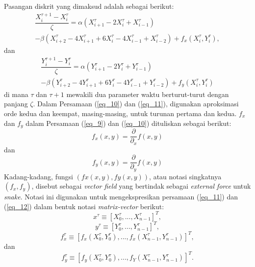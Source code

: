 Pasangan diskrit yang dimaksud adalah sebagai berikut:
\begin{multline}\label{eq_9}
\dfrac{ X^{\tau+1}_i - X^{\tau}_i }{\zeta} = \alpha(  X^\tau_{i+1}  - 2X^\tau_i + X^\tau_{i-1}  ) \\
-\beta (  X^\tau_{i+2}  - 4X^\tau_{i+1} + 6X^\tau_i - 4X^\tau_{i-1} + X^\tau_{i-2} ) + f_{x}(X^\tau_i, Y^\tau_i),
\end{multline}
dan
\begin{multline}
\label{eq_10}
\dfrac{ Y^{\tau+1}_i - Y^{\tau}_i }{\zeta} = \alpha(  Y^\tau_{i+1}  - 2Y^\tau_i + Y^\tau_{i-1}  ) \\
-\beta (  Y^\tau_{i+2}  - 4Y^\tau_{i+1} + 6Y^\tau_i - 4Y^\tau_{i-1} + Y^\tau_{i-2} ) + f_{y}(X^\tau_i, Y^\tau_i)
\end{multline}
di mana $\tau$ dan $\tau+1$ mewakili dua parameter waktu berturut-turut dengan panjang $\zeta$. Dalam Persamaan (\ref{eq_10}) dan (\ref{eq_11}), digunakan aproksimasi orde kedua dan keempat, masing-masing, untuk turunan pertama dan kedua. $f_x$ dan $f_y$ dalam Persamaan (\ref{eq_9}) dan (\ref{eq_10}) dituliskan sebagai berikut:
\begin{equation}
\label{eq_11}
f_x(x,y)=\dfrac{\partial}{\partial_x}f(x,y)
\end{equation}
dan
\begin{equation}
\label{eq_12}
f_y(x,y)=\dfrac{\partial}{\partial_y}f(x,y)
\end{equation}
Kadang-kadang, fungsi $(fx(x, y), fy(x, y))$, atau notasi singkatnya $(f_x, f_y)$, disebut sebagai \emph{vector field} yang bertindak sebagai \emph{external force} untuk \emph{snake}. Notasi ini digunakan untuk mengekspresikan persamaan (\ref{eq_11}) dan (\ref{eq_12}) dalam bentuk notasi \emph{matrix-vector} berikut\citep{acton2007biomedical:19}:
\begin{equation}
\label{eq_13}
x^\tau \equiv \left[X^\tau_0,...,X^\tau_{n-1}\right]^T ,
\end{equation}
\begin{equation}
\label{eq_14}
y^\tau \equiv \left[Y^\tau_0,...,Y^\tau_{n-1}\right]^T ,
\end{equation}
\begin{equation}
\label{eq_15}
f^\tau_x \equiv \left[f_x(X^\tau_0, Y^\tau_0),...,f_x(X^\tau_{n-1}, Y^\tau_{n-1})\right]^T ,
\end{equation}
dan
\begin{equation}
\label{eq_16}
f^\tau_y \equiv \left[f_y(X^\tau_0, Y^\tau_0),...,f_Y(X^\tau_{n-1}, Y^\tau_{n-1})\right]^T .
\end{equation}
